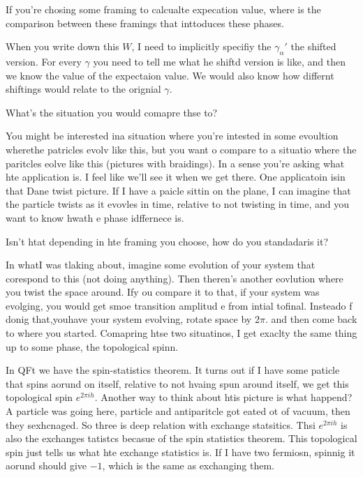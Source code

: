\begin{question}
    If you're chosing some framing to calcualte expecation value,
    where is the comparison between these framings that inttoduces these phases.
\end{question}
When you write down this $W$,
I need to implicitly specifiy the $\gamma_\alpha'$ the shifted version.
For every $\gamma$ you need to tell me what he shiftd version is like,
and then we know the value of the expectaion value.
We would also know how differnt shiftings would relate to the orignial $\gamma$.

\begin{question}
    What's the situation you would comapre thse to?
\end{question}
You might be interested ina situation where you're intested in some evoultion
wherethe patricles evolv like this,
but you want o compare to a situatio where the paritcles eolve like this
(pictures with braidings).
In a sense you're asking what hte application is.
I feel like we'll see it when we get there.
One applicatoin isin that Dane twist picture.
If I have a paicle sittin on the plane,
I can imagine that the particle twists as it evovles in time,
relative to not twisting in time,
and you want to know hwath e phase idffernece is.

\begin{question}
    Isn't htat depending in hte framing you choose,
    how do you standadaris it?
\end{question}
In whatI was tlaking about,
imagine some evolution of your system that corespond to this (not doing
anything).
Then theren's another eovlution where you twist the space around.
Ify ou compare it to that,
if your system was evolging,
you would get smoe transition amplitud e from intial tofinal.
Insteado f donig that,youhave your system evolving,
rotate space by $2\pi$. and then come back to where you started.
Comapring htse two situatinos,
I get exaclty the same thing up to some phase,
the topological spinn.

In QFt we have the spin-statistics theorem.
It turns out
if I have some paticle that spins aorund on itself,
relative to not hvaing spun around itself,
we get this topological spin $e^{2\pi ih}$.
Another way to think about htis picture is what happend?
A particle was going here,
particle and antiparitcle got eated ot of vacuum,
then they sexhcnaged.
So three is  deep relation with exchange statsitics.
Thsi $e^{2\pi i h}$ is also the exchanges tatistcs
becasue of the spin statistics theorem.
This topological spin just tells us what hte exchange statistics is.
If I have two fermiosn,
spinnig it aorund should give $-1$,
which is the same as exchanging them.

